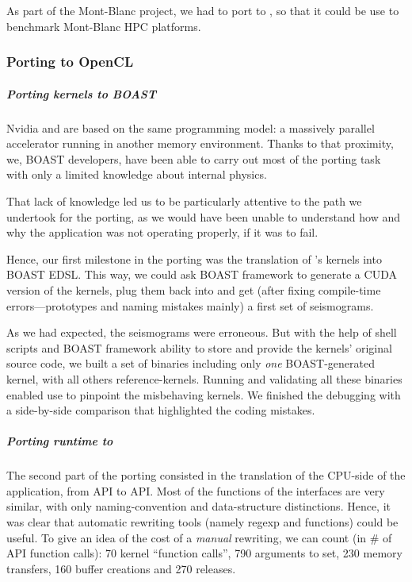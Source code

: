 As part of the Mont-Blanc project, we had to port \Specfem to \OCL, so
that it could be use to benchmark Mont-Blanc HPC platforms.

\subsubsection{Porting to OpenCL}

\subparagraph{Porting kernels to BOAST} Nvidia \Cuda and \OCL are
based on the same programming model: a massively parallel accelerator
running in another memory environment. Thanks to that proximity, we,
BOAST developers, have been able to carry out most of the porting task
with only a limited knowledge about \Specfem internal physics.

That lack of knowledge led us to be particularly attentive to the path
we undertook for the porting, as we would have been unable to
understand how and why the application was not operating properly, if
it was to fail.

Hence, our first milestone in the porting was the translation of
\Specfem's \Cuda kernels into BOAST EDSL. This way, we could ask BOAST
framework to generate a CUDA version of the kernels, plug them back
into \Specfem and get (after fixing compile-time errors---prototypes
and naming mistakes mainly) a first set of \Specfem seismograms.

As we had expected, the seismograms were erroneous. But with the help
of shell scripts and BOAST framework ability to store and provide the
kernels' original source code, we built a set of \Specfem binaries
including only \emph{one} BOAST-generated kernel, with all others
reference-kernels. Running and validating all these binaries enabled
use to pinpoint the misbehaving kernels. We finished the debugging
with a side-by-side comparison that highlighted the coding mistakes.

\subparagraph{Porting runtime to \OCL} The second part of the porting
consisted in the translation of the CPU-side of the application, from
\Cuda API to \OCL API. Most of the functions of the interfaces are
very similar, with only naming-convention and data-structure
distinctions. Hence, it was clear that automatic rewriting tools
(namely  regexp and  functions) could be
useful. To give an idea of the cost of a \emph{manual} rewriting, we
can count (in \# of \OCL API function calls): 70 kernel ``function
calls'', 790 arguments to set, 230 memory transfers, 160 buffer
creations and 270 releases.

